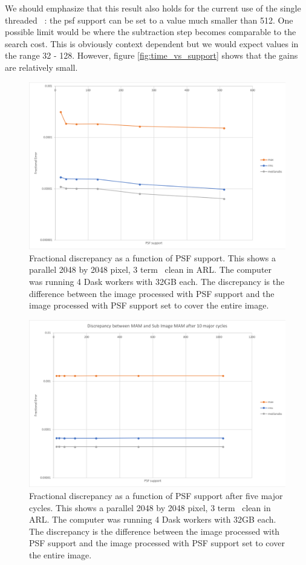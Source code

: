 \documentclass[11pt,a4paper,variablewidth]{article}
\begin{document}
We should emphasize that this result also holds for the current use of the single threaded \MAM\ : the psf support can be set to a value much smaller than 512. One possible limit would be where the subtraction step becomes comparable to the search cost. This is obviously context dependent but we would expect values in the range 32 - 128. However, figure \ref{fig:time_vs_support} shows that the gains are relatively small.

\begin{figure}[h]
  \centering
  \includegraphics[width=\textwidth]{./pngs/error_versus_support.png}
  \caption{Fractional discrepancy as a function of PSF support. This shows a parallel 2048 by 2048 pixel, 3 term \MAM\ clean in ARL. The computer was running 4 Dask workers with 32GB each. The discrepancy is the difference between the image processed with PSF support and the image processed with PSF support set to cover the entire image.}
  \label{fig:error_vs_support}
\end{figure}

\begin{figure}[h]
  \centering
  \includegraphics[width=\textwidth]{./pngs/error_versus_support_ci.png}
  \caption{Fractional discrepancy as a function of PSF support after five major cycles. This shows a parallel 2048 by 2048 pixel, 3 term \MAM\ clean in ARL. The computer was running 4 Dask workers with 32GB each. The discrepancy is the difference between the image processed with PSF support and the image processed with PSF support set to cover the entire image.}
  \label{fig:error_vs_support_ci}
\end{figure}
\end{document}
